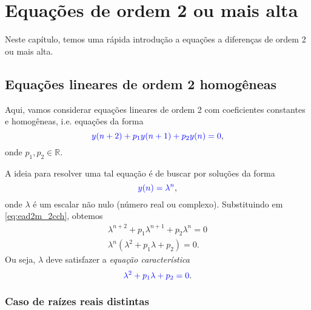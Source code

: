 
\chapter{Equações de ordem 2 ou mais alta}\label{cap_ead2m}

Neste capítulo, temos uma rápida introdução a equações a diferenças de ordem 2 ou mais alta.

\section{Equações lineares de ordem 2 homogêneas}\label{cap_ead2m}

Aqui, vamos considerar equações lineares de ordem 2 com coeficientes constantes e homogêneas, i.e. equações da forma
\begin{equation}\label{eq:ead2m_2cch}
  {\color{blue}y(n+2)+p_1y(n+1)+p_2y(n)=0},
\end{equation}
onde $p_1,p_2\in\mathbb{R}$.

A ideia para resolver uma tal equação é de buscar por soluções da forma
\begin{equation}
  {\color{blue}y(n)=\lambda^n},
\end{equation}
onde $\lambda$ é um escalar não nulo (número real ou complexo). Substituindo em \eqref{eq:ead2m_2cch}, obtemos
\begin{align}
  \lambda^{n+2}+p_1\lambda^{n+1} + p_2\lambda^n = 0\\
  \lambda^n\left(\lambda^{2}+p_1\lambda + p_2\right) = 0.
\end{align}
Ou seja, $\lambda$ deve satisfazer a \emph{equação característica}
\begin{equation}\label{eq:ead2m_2ec}
  {\color{blue}\lambda^{2}+p_1\lambda + p_2 = 0}.
\end{equation}

\subsection{Caso de raízes reais distintas}

